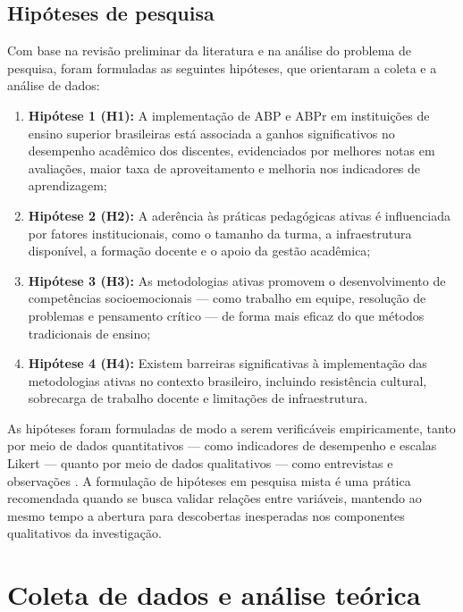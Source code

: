 \subsection{Hipóteses de pesquisa}
\label{subsec:hipoteses_pesquisa}

Com base na revisão preliminar da literatura e na análise do problema de pesquisa, foram formuladas as seguintes hipóteses, que orientaram a coleta e a análise de dados:

\begin{enumerate}
    \item \textbf{Hipótese 1 (H1):} A implementação de ABP e ABPr em instituições de ensino superior brasileiras está associada a ganhos significativos no desempenho acadêmico dos discentes, evidenciados por melhores notas em avaliações, maior taxa de aproveitamento e melhoria nos indicadores de aprendizagem;
    \item \textbf{Hipótese 2 (H2):} A aderência às práticas pedagógicas ativas é influenciada por fatores institucionais, como o tamanho da turma, a infraestrutura disponível, a formação docente e o apoio da gestão acadêmica;
    \item \textbf{Hipótese 3 (H3):} As metodologias ativas promovem o desenvolvimento de competências socioemocionais — como trabalho em equipe, resolução de problemas e pensamento crítico — de forma mais eficaz do que métodos tradicionais de ensino;
    \item \textbf{Hipótese 4 (H4):} Existem barreiras significativas à implementação das metodologias ativas no contexto brasileiro, incluindo resistência cultural, sobrecarga de trabalho docente e limitações de infraestrutura.
\end{enumerate}

As hipóteses foram formuladas de modo a serem verificáveis empiricamente, tanto por meio de dados quantitativos — como indicadores de desempenho e escalas Likert — quanto por meio de dados qualitativos — como entrevistas e observações \cite{CRESWELL2018}. A formulação de hipóteses em pesquisa mista é uma prática recomendada quando se busca validar relações entre variáveis, mantendo ao mesmo tempo a abertura para descobertas inesperadas nos componentes qualitativos da investigação.

\section{Coleta de dados e análise teórica}
\label{sec:coleta_analise}

